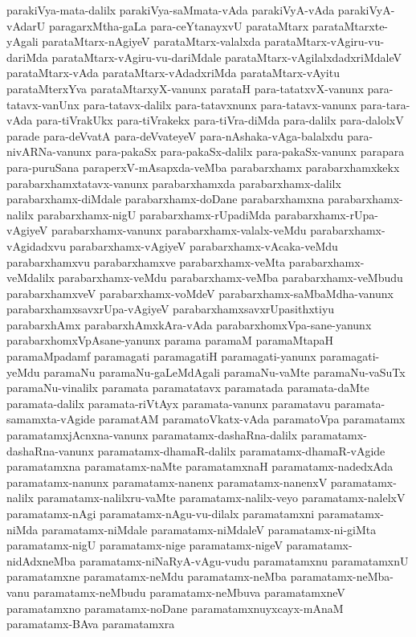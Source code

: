 {parakiVya-mata-dalilx
parakiVya-saMmata-vAda
parakiVyA-vAda
parakiVyA-vAdarU
paragarxMtha-gaLa
para-ceYtanayxvU
parataMtarx
parataMtarxte-yAgali
parataMtarx-nAgiyeV
parataMtarx-valalxda
parataMtarx-vAgiru-vu-dariMda
parataMtarx-vAgiru-vu-dariMdale
parataMtarx-vAgilalxdadxriMdaleV
parataMtarx-vAda
parataMtarx-vAdadxriMda
parataMtarx-vAyitu
parataMterxYva
parataMtarxyX-vanunx
parataH
para-tatatxvX-vanunx
para-tatavx-vanUnx
para-tatavx-dalilx
para-tatavxnunx
para-tatavx-vanunx
para-tara-vAda
para-tiVrakUkx
para-tiVrakekx
para-tiVra-diMda
para-dalilx
para-dalolxV
parade
para-deVvatA
para-deVvateyeV
para-nAshaka-vAga-balalxdu
para-nivARNa-vanunx
para-pakaSx
para-pakaSx-dalilx
para-pakaSx-vanunx
parapara
para-puruSana
paraperxV-mAsapxda-veMba
parabarxhamx
parabarxhamxkekx
parabarxhamxtatavx-vanunx
parabarxhamxda
parabarxhamx-dalilx
parabarxhamx-diMdale
parabarxhamx-doDane
parabarxhamxna
parabarxhamx-nalilx
parabarxhamx-nigU
parabarxhamx-rUpadiMda
parabarxhamx-rUpa-vAgiyeV
parabarxhamx-vanunx
parabarxhamx-valalx-veMdu
parabarxhamx-vAgidadxvu
parabarxhamx-vAgiyeV
parabarxhamx-vAcaka-veMdu
parabarxhamxvu
parabarxhamxve
parabarxhamx-veMta
parabarxhamx-veMdalilx
parabarxhamx-veMdu
parabarxhamx-veMba
parabarxhamx-veMbudu
parabarxhamxveV
parabarxhamx-voMdeV
parabarxhamx-saMbaMdha-vanunx
parabarxhamxsavxrUpa-vAgiyeV
parabarxhamxsavxrUpasithxtiyu
parabarxhAmx
parabarxhAmxkAra-vAda
parabarxhomxVpa-sane-yanunx
parabarxhomxVpAsane-yanunx
parama
paramaM
paramaMtapaH
paramaMpadamf
paramagati
paramagatiH
paramagati-yanunx
paramagati-yeMdu
paramaNu
paramaNu-gaLeMdAgali
paramaNu-vaMte
paramaNu-vaSuTx
paramaNu-vinalilx
paramata
paramatatavx
paramatada
paramata-daMte
paramata-dalilx
paramata-riVtAyx
paramata-vanunx
paramatavu
paramata-samamxta-vAgide
paramatAM
paramatoVkatx-vAda
paramatoVpa
paramatamx
paramatamxjAcnxna-vanunx
paramatamx-dashaRna-dalilx
paramatamx-dashaRna-vanunx
paramatamx-dhamaR-dalilx
paramatamx-dhamaR-vAgide
paramatamxna
paramatamx-naMte
paramatamxnaH
paramatamx-nadedxAda
paramatamx-nanunx
paramatamx-nanenx
paramatamx-nanenxV
paramatamx-nalilx
paramatamx-nalilxru-vaMte
paramatamx-nalilx-veyo
paramatamx-nalelxV
paramatamx-nAgi
paramatamx-nAgu-vu-dilalx
paramatamxni
paramatamx-niMda
paramatamx-niMdale
paramatamx-niMdaleV
paramatamx-ni-giMta
paramatamx-nigU
paramatamx-nige
paramatamx-nigeV
paramatamx-nidAdxneMba
paramatamx-niNaRyA-vAgu-vudu
paramatamxnu
paramatamxnU
paramatamxne
paramatamx-neMdu
paramatamx-neMba
paramatamx-neMba-vanu
paramatamx-neMbudu
paramatamx-neMbuva
paramatamxneV
paramatamxno
paramatamx-noDane
paramatamxnuyxcayx-mAnaM
paramatamx-BAva
paramatamxra
}
